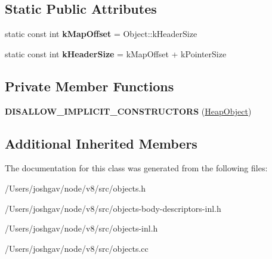 \subsection*{Static Public Attributes}
\begin{DoxyCompactItemize}
\item 
static const int {\bfseries k\+Map\+Offset} = Object\+::k\+Header\+Size\hypertarget{classv8_1_1internal_1_1_heap_object_a0c150f83dc5605634f591e84c8a8ce2a}{}\label{classv8_1_1internal_1_1_heap_object_a0c150f83dc5605634f591e84c8a8ce2a}

\item 
static const int {\bfseries k\+Header\+Size} = k\+Map\+Offset + k\+Pointer\+Size\hypertarget{classv8_1_1internal_1_1_heap_object_ac3b060e34e0c5523cd8ad9d734a0a498}{}\label{classv8_1_1internal_1_1_heap_object_ac3b060e34e0c5523cd8ad9d734a0a498}

\end{DoxyCompactItemize}
\subsection*{Private Member Functions}
\begin{DoxyCompactItemize}
\item 
{\bfseries D\+I\+S\+A\+L\+L\+O\+W\+\_\+\+I\+M\+P\+L\+I\+C\+I\+T\+\_\+\+C\+O\+N\+S\+T\+R\+U\+C\+T\+O\+RS} (\hyperlink{classv8_1_1internal_1_1_heap_object}{Heap\+Object})\hypertarget{classv8_1_1internal_1_1_heap_object_a8df844ce1343a06b876068940098fb46}{}\label{classv8_1_1internal_1_1_heap_object_a8df844ce1343a06b876068940098fb46}

\end{DoxyCompactItemize}
\subsection*{Additional Inherited Members}


The documentation for this class was generated from the following files\+:\begin{DoxyCompactItemize}
\item 
/\+Users/joshgav/node/v8/src/objects.\+h\item 
/\+Users/joshgav/node/v8/src/objects-\/body-\/descriptors-\/inl.\+h\item 
/\+Users/joshgav/node/v8/src/objects-\/inl.\+h\item 
/\+Users/joshgav/node/v8/src/objects.\+cc\end{DoxyCompactItemize}
